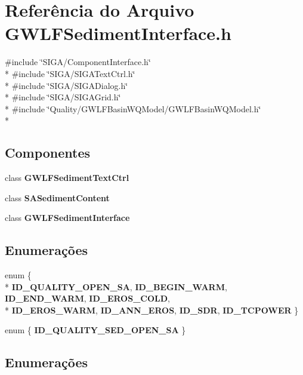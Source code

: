 \section{Referência do Arquivo G\+W\+L\+F\+Sediment\+Interface.\+h}
\label{_g_w_l_f_sediment_interface_8h}
{\ttfamily \#include \char`\"{}S\+I\+G\+A/\+Component\+Interface.\+h\char`\"{}}\\*
{\ttfamily \#include \char`\"{}S\+I\+G\+A/\+S\+I\+G\+A\+Text\+Ctrl.\+h\char`\"{}}\\*
{\ttfamily \#include \char`\"{}S\+I\+G\+A/\+S\+I\+G\+A\+Dialog.\+h\char`\"{}}\\*
{\ttfamily \#include \char`\"{}S\+I\+G\+A/\+S\+I\+G\+A\+Grid.\+h\char`\"{}}\\*
{\ttfamily \#include \char`\"{}Quality/\+G\+W\+L\+F\+Basin\+W\+Q\+Model/\+G\+W\+L\+F\+Basin\+W\+Q\+Model.\+h\char`\"{}}\\*
\subsection*{Componentes}
\begin{DoxyCompactItemize}
\item 
class {\bf G\+W\+L\+F\+Sediment\+Text\+Ctrl}
\item 
class {\bf S\+A\+Sediment\+Content}
\item 
class {\bf G\+W\+L\+F\+Sediment\+Interface}
\end{DoxyCompactItemize}
\subsection*{Enumerações}
\begin{DoxyCompactItemize}
\item 
enum \{ \\*
{\bf I\+D\+\_\+\+Q\+U\+A\+L\+I\+T\+Y\+\_\+\+O\+P\+E\+N\+\_\+\+SA}, 
{\bf I\+D\+\_\+\+B\+E\+G\+I\+N\+\_\+\+W\+A\+RM}, 
{\bf I\+D\+\_\+\+E\+N\+D\+\_\+\+W\+A\+RM}, 
{\bf I\+D\+\_\+\+E\+R\+O\+S\+\_\+\+C\+O\+LD}, 
\\*
{\bf I\+D\+\_\+\+E\+R\+O\+S\+\_\+\+W\+A\+RM}, 
{\bf I\+D\+\_\+\+A\+N\+N\+\_\+\+E\+R\+OS}, 
{\bf I\+D\+\_\+\+S\+DR}, 
{\bf I\+D\+\_\+\+T\+C\+P\+O\+W\+ER}
 \}
\item 
enum \{ {\bf I\+D\+\_\+\+Q\+U\+A\+L\+I\+T\+Y\+\_\+\+S\+E\+D\+\_\+\+O\+P\+E\+N\+\_\+\+SA}
 \}
\end{DoxyCompactItemize}


\subsection{Enumerações}
